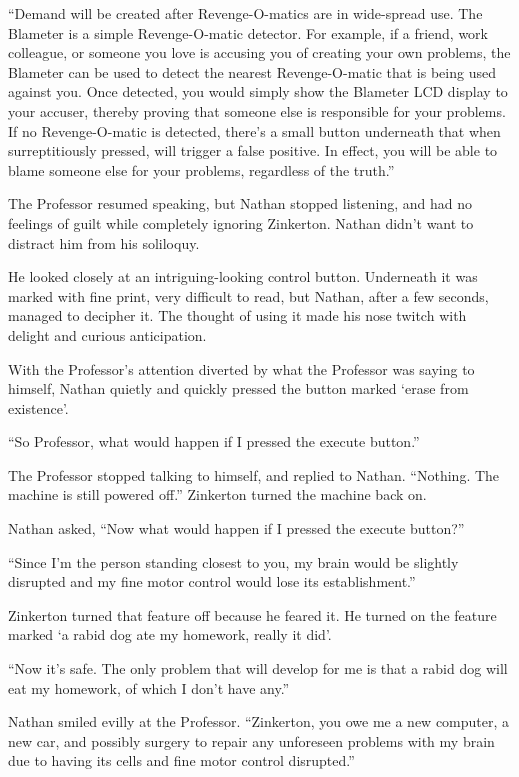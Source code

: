 “Demand will be created after Revenge-O-matics are in wide-spread use. The Blameter is a simple Revenge-O-matic detector. For example, if a friend, work colleague, or someone you love is accusing you of creating your own problems, the Blameter can be used to detect the nearest Revenge-O-matic that is being used against you. Once detected, you would simply show the Blameter LCD display to your accuser, thereby proving that someone else is responsible for your problems. If no Revenge-O-matic is detected, there's a small button underneath that when surreptitiously pressed, will trigger a false positive. In effect, you will be able to blame someone else for your problems, regardless of the truth.”

The Professor resumed speaking, but Nathan stopped listening, and had no feelings of guilt while completely ignoring Zinkerton. Nathan didn't want to distract him from his soliloquy.

He looked closely at an intriguing-looking control button. Underneath it was marked with fine print, very difficult to read, but Nathan, after a few seconds, managed to decipher it. The thought of using it made his nose twitch with delight and curious anticipation.

With the Professor's attention diverted by what the Professor was saying to himself, Nathan quietly and quickly pressed the button marked ‘erase from existence’.

“So Professor, what would happen if I pressed the execute button.”

The Professor stopped talking to himself, and replied to Nathan. “Nothing. The machine is still powered off.” Zinkerton turned the machine back on.

Nathan asked, “Now what would happen if I pressed the execute button?”

“Since I'm the person standing closest to you, my brain would be slightly disrupted and my fine motor control would lose its establishment.”

Zinkerton turned that feature off because he feared it. He turned on the feature marked ‘a rabid dog ate my homework, really it did’.

“Now it's safe. The only problem that will develop for me is that a rabid dog will eat my homework, of which I don't have any.”

Nathan smiled evilly at the Professor. “Zinkerton, you owe me a new computer, a new car, and possibly surgery to repair any unforeseen problems with my brain due to having its cells and fine motor control disrupted.”

